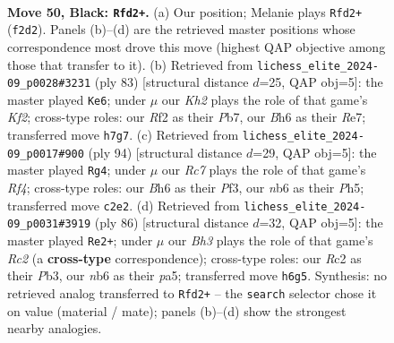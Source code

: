 \documentclass[11pt]{article}
\begin{document}
\clearpage

\begin{figure}[p]\centering
\begin{subfigure}{0.46\textwidth}\centering
\resizebox{\linewidth}{!}{%
\newchessgame
\chessboard[
  setfen={3R4/1p5k/1N4pb/5p1p/P2K4/6PP/2r2r2/8 b - - 3 50},
  showmover=false,
  pgfstyle=straightmove, color=movearrow, markmove={f2-d2}
]}
\caption{}
\end{subfigure}\hfill
\begin{subfigure}{0.46\textwidth}\centering
\resizebox{\linewidth}{!}{%
\newchessgame
\chessboard[
  setfen={3R4/1p2rk2/p1p5/2P1b2p/PP2N3/5K2/8/8 b - - 1 42},
  showmover=false,
  pgfstyle=straightmove, color=movearrow, markmove={f7-e6}
]}
\caption{}
\end{subfigure}
\\[4pt]
\begin{subfigure}{0.46\textwidth}\centering
\resizebox{\linewidth}{!}{%
\newchessgame
\chessboard[
  setfen={k3r3/8/2p4p/7P/P2P1R2/2P2PK1/1P6/8 w - - 0 48},
  showmover=false,
  pgfstyle=straightmove, color=movearrow, markmove={f4-g4}
]}
\caption{}
\end{subfigure}\hfill
\begin{subfigure}{0.46\textwidth}\centering
\resizebox{\linewidth}{!}{%
\newchessgame
\chessboard[
  setfen={8/6p1/4kp2/p6p/P6P/1PK3P1/2R2P2/3r4 w - - 4 44},
  showmover=false,
  pgfstyle=straightmove, color=movearrow, markmove={c2-e2}
]}
\caption{}
\end{subfigure}
\caption{\textbf{Move 50, Black: \texttt{Rfd2+}.} (a) Our position; Melanie plays \texttt{Rfd2+} (\texttt{f2d2}). Panels (b)--(d) are the retrieved master positions whose correspondence most drove this move (highest QAP objective among those that transfer to it). (b) Retrieved from \texttt{lichess\_elite\_2024-09\_p0028\#3231} (ply 83) [structural distance $d$=25, QAP obj=5]: the master played \texttt{Ke6}; under $\mu$ our \emph{Kh2} plays the role of that game's \emph{Kf2}; cross-type roles: our \emph{R}f2 as their \emph{P}b7, our \emph{B}h6 as their \emph{R}e7; transferred move \texttt{h7g7}. (c) Retrieved from \texttt{lichess\_elite\_2024-09\_p0017\#900} (ply 94) [structural distance $d$=29, QAP obj=5]: the master played \texttt{Rg4}; under $\mu$ our \emph{Rc7} plays the role of that game's \emph{Rf4}; cross-type roles: our \emph{B}h6 as their \emph{P}f3, our \emph{n}b6 as their \emph{P}h5; transferred move \texttt{c2e2}. (d) Retrieved from \texttt{lichess\_elite\_2024-09\_p0031\#3919} (ply 86) [structural distance $d$=32, QAP obj=5]: the master played \texttt{Re2+}; under $\mu$ our \emph{Bh3} plays the role of that game's \emph{Rc2} (a \textbf{cross-type} correspondence); cross-type roles: our \emph{R}c2 as their \emph{P}b3, our \emph{n}b6 as their \emph{p}a5; transferred move \texttt{h6g5}. Synthesis: no retrieved analog transferred to \texttt{Rfd2+} -- the \texttt{search} selector chose it on value (material / mate); panels (b)--(d) show the strongest nearby analogies.}
\label{fig:thought-m99}
\end{figure}
\end{document}
